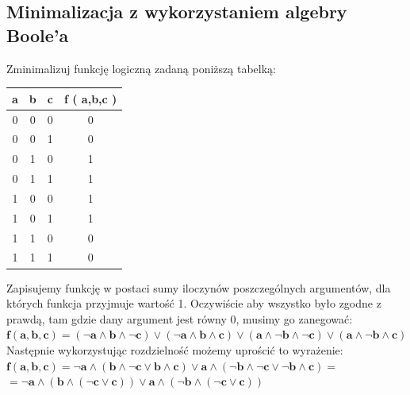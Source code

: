 \documentclass[12pt]{article}
\begin{document}
	\subsection{Minimalizacja z wykorzystaniem algebry Boole’a}
	\begin{exercise}
		Zminimalizuj funkcję logiczną zadaną poniższą tabelką:
		\begin{table}[H]
		\centering
		\begin{tabular}{|c|c|c|c|}
		\hline
		\textbf{a} & \textbf{b} & \textbf{c} & \textbf{f ( a,b,c )} \\ \hline
		0          & 0          & 0          & 0                    \\ \hline
		0          & 0          & 1          & 0                    \\ \hline
		0          & 1          & 0          & 1                    \\ \hline
		0          & 1          & 1          & 1                    \\ \hline
		1          & 0          & 0          & 1                    \\ \hline
		1          & 0          & 1          & 1                    \\ \hline
		1          & 1          & 0          & 0                    \\ \hline
		1          & 1          & 1          & 0                    \\ \hline
		\end{tabular}
		\end{table}
	\end{exercise}

	\noindent Zapisujemy funkcję w postaci sumy iloczynów poszczególnych argumentów, dla których funkcja przyjmuje wartość 1.
	Oczywiście aby wszystko było zgodne z prawdą, tam gdzie dany argument jest równy 0, musimy go zanegować: \\

	\noindent $\mathbf{f(a, b, c) = (\neg a \wedge b \wedge \neg c) \vee (\neg a \wedge b \wedge c) \vee (a \wedge \neg b \wedge \neg c) \vee (a \wedge \neg b \wedge c)}$ \\

	\noindent Następnie wykorzystując rozdzielność możemy uprościć to wyrażenie: \\

	\noindent $\mathbf{f(a, b, c) = \neg a \wedge (b \wedge \neg c \vee b \wedge c) \vee a \wedge ( \neg b \wedge \neg c \vee \neg b \wedge c) =}$ \\
	\noindent $\mathbf{= \neg a \wedge (b \wedge ( \neg c \vee c)) \vee a \wedge ( \neg b \wedge ( \neg c \vee c))}$ \\
\end{document}
